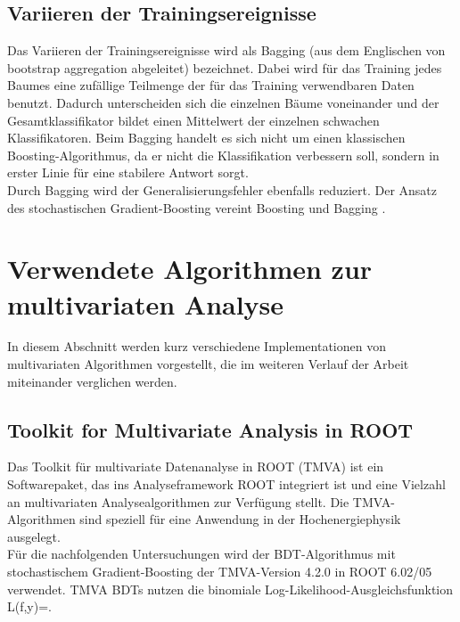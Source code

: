 \subsection{Variieren der Trainingsereignisse}
\label{ch:Algorithmen:subsec:Bagging}

Das Variieren der Trainingsereignisse wird als Bagging (aus dem Englischen von bootstrap aggregation abgeleitet) bezeichnet. Dabei wird f\"ur das Training jedes Baumes eine zuf\"allige Teilmenge der f\"ur das Training verwendbaren Daten benutzt. Dadurch unterscheiden sich die einzelnen B\"aume voneinander und der Gesamtklassifikator bildet einen Mittelwert der einzelnen schwachen Klassifikatoren.
Beim Bagging handelt es sich nicht um einen klassischen Boosting-Algorithmus, da er nicht die Klassifikation verbessern soll, sondern in erster Linie f\"ur eine stabilere Antwort sorgt.\\
Durch Bagging wird der Generalisierungsfehler ebenfalls reduziert.
Der Ansatz des stochastischen Gradient-Boosting vereint Boosting und Bagging \cite{Friedman:2002:SGB:635939.635941}.


\section{Verwendete Algorithmen zur multivariaten Analyse}
\label{ch:Algorithmen:subsec:Implementationen}

In diesem Abschnitt werden kurz verschiedene Implementationen von multivariaten Algorithmen vorgestellt, die im weiteren Verlauf der Arbeit miteinander verglichen werden.

\subsection{Toolkit for Multivariate Analysis in ROOT}
\label{ch:Algorithmen:subsec:TMVA}

Das Toolkit f\"ur multivariate Datenanalyse in ROOT (TMVA) \cite{Hocker:2007ht} ist ein Softwarepaket, das ins Analyseframework ROOT \cite{ROOT} integriert ist und eine Vielzahl an multivariaten Analysealgorithmen zur Verf\"ugung stellt. Die TMVA-Algorithmen sind speziell f\"ur eine Anwendung in der Hochenergiephysik ausgelegt.\\
F\"ur die nachfolgenden Untersuchungen wird der BDT-Algorithmus mit stochastischem Gradient-Boosting der TMVA-Version 4.2.0 in ROOT 6.02/05 verwendet. TMVA BDTs nutzen die binomiale Log-Likelihood-Ausgleichsfunktion
\beq
L(f,y)=.
\label{eq:tmva_loss}
\eeq


